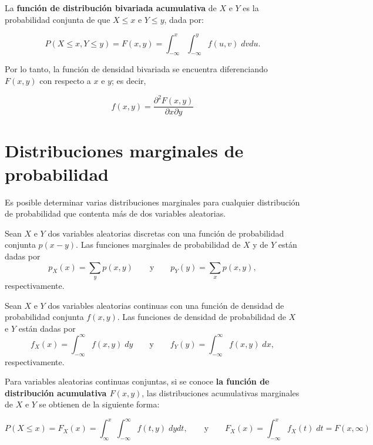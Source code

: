 La \textbf{función de distribución bivariada acumulativa} de $X$ e $Y$ es la probabilidad conjunta de que $X\leq x$ e $Y\leq y$, dada por:
\begin{tcolorbox}
    $$P(X\leq x, Y\leq y)=F(x,y)=\int_{-\infty}^x \int_{-\infty}^y f(u,v)\; dvdu.$$
\end{tcolorbox}
Por lo tanto, la función de densidad bivariada se encuentra diferenciando $F(x,y)$ con respecto a $x$ e $y$; es decir,

\begin{tcolorbox}
    $$f(x,y)=\dfrac{\partial^2 F(x,y)}{\partial x \partial y}$$
\end{tcolorbox}


\section{Distribuciones marginales de probabilidad}
Es posible determinar varias distribuciones marginales para cualquier distribución de probabilidad que contenta más de dos variables aleatorias.

\begin{tcolorbox}
    \begin{def.}
	Sean $X$ e $Y$ dos variables aleatorias discretas con una función de probabilidad conjunta $p(x-y)$. Las funciones marginales de probabilidad de $X$ y de $Y$ están dadas por
	$$p_X(x)=\sum_y p(x,y)\qquad \mbox{y}\qquad p_Y(y)=\sum_x p(x,y),$$
	respectivamente.
    \end{def.}
\end{tcolorbox}

\begin{tcolorbox}
    \begin{def.}
	Sean $X$ e $Y$ dos variables aleatorias continuas con una función de densidad de probabilidad conjunta $f(x,y)$. Las funciones de densidad de probabilidad de $X$ e $Y$ están dadas por
	$$f_X(x)=\int_{-\infty}^\infty f(x,y)\; dy \qquad \mbox{y} \qquad f_Y(y)=\int_{-\infty}^\infty f(x,y)\; dx,$$
	respectivamente.
    \end{def.}
\end{tcolorbox}

Para variables aleatorias continuas conjuntas, si se conoce \textbf{\boldmath la función de distribución acumulativa $F(x,y)$}, las distribuciones acumulativas marginales de $X$ e $Y$ se obtienen de la siguiente forma:

\begin{tcolorbox}
    $$P(X\leq x)=F_X(x)=\int_{\infty}^x \int_{-\infty}^\infty f(t,y)\; dydt,\qquad \mbox{y}\qquad F_X(x)=\int_{-\infty}^x f_X(t)\; dt = F(x,\infty)$$
\end{tcolorbox}


